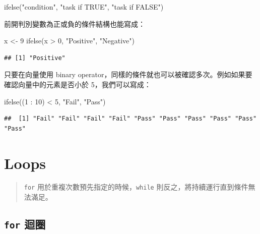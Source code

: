 \documentclass[
]{book}
\newenvironment{Shaded}{\begin{snugshade}}{\end{snugshade}}
\newcommand{\DecValTok}[1]{\textcolor[rgb]{0.00,0.00,0.81}{#1}}
\newcommand{\FunctionTok}[1]{\textcolor[rgb]{0.00,0.00,0.00}{#1}}
\newcommand{\NormalTok}[1]{#1}
\newcommand{\OtherTok}[1]{\textcolor[rgb]{0.56,0.35,0.01}{#1}}
\newcommand{\SpecialCharTok}[1]{\textcolor[rgb]{0.00,0.00,0.00}{#1}}
\newcommand{\StringTok}[1]{\textcolor[rgb]{0.31,0.60,0.02}{#1}}
\theoremstyle{definition}
\theoremstyle{remark}
\begin{document}
\begin{Shaded}
\begin{Highlighting}[]
\FunctionTok{ifelse}\NormalTok{(}\StringTok{"condition"}\NormalTok{, }\StringTok{"task if TRUE"}\NormalTok{, }\StringTok{"task if FALSE"}\NormalTok{)}
\end{Highlighting}
\end{Shaded}

前開判別變數為正或負的條件結構也能寫成：

\begin{Shaded}
\begin{Highlighting}[]
\NormalTok{x }\OtherTok{\textless{}{-}} \DecValTok{9}
\FunctionTok{ifelse}\NormalTok{(x }\SpecialCharTok{\textgreater{}} \DecValTok{0}\NormalTok{, }\StringTok{"Positive"}\NormalTok{, }\StringTok{"Negative"}\NormalTok{)}
\end{Highlighting}
\end{Shaded}

\begin{verbatim}
## [1] "Positive"
\end{verbatim}

只要在向量使用 binary operator，同樣的條件就也可以被確認多次。例如如果要確認向量中的元素是否小於 5，我們可以寫成：

\begin{Shaded}
\begin{Highlighting}[]
\FunctionTok{ifelse}\NormalTok{((}\DecValTok{1} \SpecialCharTok{:} \DecValTok{10}\NormalTok{) }\SpecialCharTok{\textless{}} \DecValTok{5}\NormalTok{, }\StringTok{"Fail"}\NormalTok{, }\StringTok{"Pass"}\NormalTok{)}
\end{Highlighting}
\end{Shaded}

\begin{verbatim}
##  [1] "Fail" "Fail" "Fail" "Fail" "Pass" "Pass" "Pass" "Pass" "Pass" "Pass"
\end{verbatim}

\hypertarget{loops}{%
\section{Loops}\label{loops}}

\begin{quote}
\texttt{for} 用於重複次數預先指定的時候，\texttt{while} 則反之，將持續運行直到條件無法滿足。
\end{quote}

\hypertarget{for-ux8ff4ux5708}{%
\subsection{\texorpdfstring{\texttt{for} 迴圈}{for 迴圈}}\label{for-ux8ff4ux5708}}
\end{document}
